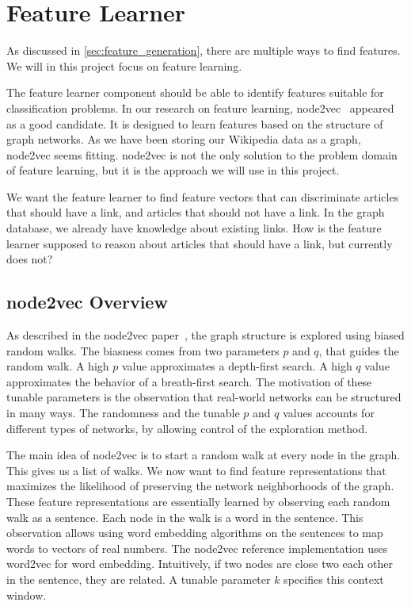 \section{Feature Learner}
As discussed in \cref{sec:feature_generation}, there are multiple ways to find features. We will in this project focus on feature learning. 

The feature learner component should be able to identify features suitable for classification problems. In our research on feature learning, node2vec~\cite{node2vec} appeared as a good candidate. It is designed to learn features based on the structure of graph networks. As we have been storing our Wikipedia data as a graph, node2vec seems fitting. node2vec is not the only solution to the problem domain of feature learning, but it is the approach we will use in this project.

We want the feature learner to find feature vectors that can discriminate articles that should have a link, and articles that should not have a link. In the graph database, we already have knowledge about existing links. How is the feature learner supposed to reason about articles that should have a link, but currently does not?

\subsection{node2vec Overview}
As described in the node2vec paper~\cite{node2vec}, the graph structure is explored using biased random walks. The biasness comes from two parameters $p$ and $q$, that guides the random walk. A high $p$  value approximates a depth-first search. A high $q$  value approximates the behavior of a breath-first search. The motivation of these tunable parameters is the observation that real-world networks can be structured in many ways. The randomness and the tunable $p$ and $q$ values accounts for different types of networks, by allowing control of the exploration method.

The main idea of node2vec is to start a random walk at every node in the graph. This gives us a list of walks. We now want to find feature representations that maximizes the likelihood of preserving the network neighborhoods of the graph. These feature representations are essentially learned by observing each random walk as a sentence. Each node in the walk is a word in the sentence. This observation allows using word embedding algorithms on the sentences to map words to vectors of real numbers. The node2vec reference implementation uses word2vec for word embedding. Intuitively, if two nodes are close two each other in the sentence, they are related. A tunable parameter $k$ specifies this context window. 

